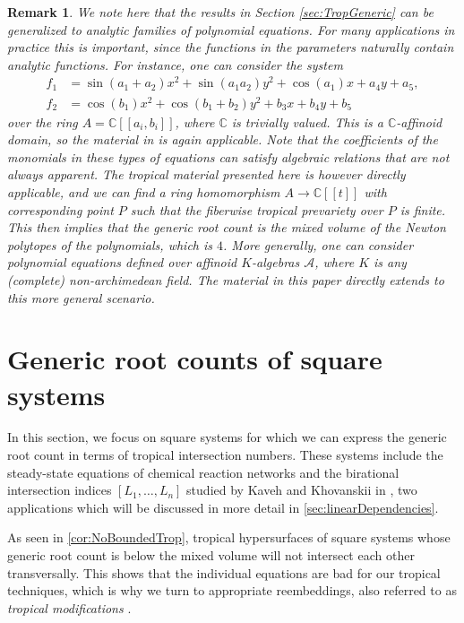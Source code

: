 \documentclass[12pt,reqno,a4paper]{amsart}
\theoremstyle{theoremstyle}
\theoremstyle{examplestyle}
\newtheorem{remark}[theorem]{Remark}
\theoremstyle{algorithmstyle}
\begin{document}
\begin{remark}\label{rem:AnalyticFamilies}
  We note here that the results in Section \ref{sec:TropGeneric} can be generalized to analytic families of polynomial equations. For many applications in practice this is important, since the functions in the parameters naturally contain analytic functions. For instance, one can consider the system
  \begin{align*}
    f_{1}&=\sin(a_{1}+a_{2})x^2+\sin(a_{1}a_{2})y^2+\cos(a_{1})x+a_{4}y+a_{5},\\
    f_{2}&=\cos(b_{1})x^2+\cos(b_{1}+b_{2})y^2+b_{3}x+b_{4}y+b_{5}
  \end{align*}
  over the ring $A=\mathbb{C}[[a_{i},b_{i}]]$, where $\mathbb{C}$ is trivially valued. This is a $\mathbb{C}$-affinoid domain, so the material in \cite[Section 2]{Berkovich1993} is again applicable. Note that the coefficients of the monomials in these types of equations can satisfy algebraic relations that are not always apparent. The tropical material presented here is however directly applicable, and we can find a ring homomorphism $A\to\mathbb{C}[[t]]$ with corresponding point $P$ such that the fiberwise tropical prevariety over $P$ is finite. This then implies that the generic root count is the mixed volume of the Newton polytopes of the polynomials, which is $4$.
  More generally, one can consider polynomial equations defined over affinoid $K$-algebras $\mathcal{A}$, where $K$ is any (complete) non-archimedean field. The material in this paper directly extends to this more general scenario.
\end{remark}
\section{Generic root counts of square systems}\label{sec:modifications}
In this section, we focus on square systems for which we can express the generic root count in terms of tropical intersection numbers.  These systems include the steady-state equations of chemical reaction networks and the birational intersection indices $[L_{1},\dots,L_{n}]$ studied by Kaveh and Khovanskii in \cite{KavehKhovanskii2010,KavehKhovanskii2012}, two applications which will be discussed in more detail in \cref{sec:linearDependencies}.

As seen in \cref{cor:NoBoundedTrop}, tropical hypersurfaces of square systems whose generic root count is below the mixed volume will not intersect each other transversally. This shows that the individual equations are bad for our tropical techniques, which is why we turn to appropriate reembeddings, also referred to as \emph{tropical modifications} \cite{Mikhalkin2006,Kalinin15}.
\end{document}
